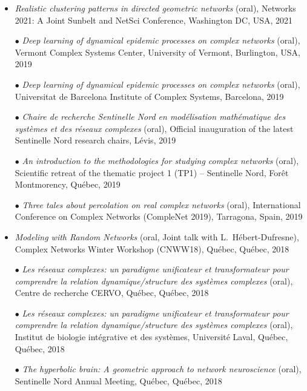 \documentclass[11pt]{article}
\newcommand{\SousTitreA}[2]{{\normalsize\textbf{#1} #2 \vspace{-0.5\baselineskip}}}
\newcommand{\SousTitreB}[2]{{\vspace{0.4\baselineskip}\SousTitreA{#1}{#2}}}
\begin{document}
%
%
%
\SousTitreB{Selected presentations\footnotemark}{}
%
%
\begin{itemize}
%
  \item \textit{Realistic clustering patterns in directed geometric networks} (oral), Networks 2021: A Joint Sunbelt and NetSci Conference, Washington DC, USA, 2021
%
  \item[$\bullet$] \textit{Deep learning of dynamical epidemic processes on complex networks} (oral), Vermont Complex Systems Center, University of Vermont, Burlington, USA, 2019
%
  \item[$\bullet$] \textit{Deep learning of dynamical epidemic processes on complex networks} (oral), Universitat de Barcelona Institute of Complex Systems, Barcelona, 2019
%
  \item[$\bullet$] \textit{Chaire de recherche Sentinelle Nord en modélisation mathématique des systèmes et des réseaux complexes} (oral), Official inauguration of the latest Sentinelle Nord research chairs, L\'evis, 2019
%
  \item[$\bullet$] \textit{An introduction to the methodologies for studying complex networks} (oral), Scientific retreat of the thematic project 1 (TP1) – Sentinelle Nord, For\^et Montmorency, Qu\'ebec, 2019
%
  \item[$\bullet$] \textit{Three tales about percolation on real complex networks} (oral), International Conference on Complex Networks (CompleNet 2019), Tarragona, Spain, 2019
%
  \item \textit{Modeling with Random Networks} (oral, Joint talk with L.~H\'ebert-Dufresne), Complex Networks Winter Workshop (CNWW18), Qu\'ebec, Qu\'ebec, 2018
%
  \item[$\bullet$] \textit{Les réseaux complexes: un paradigme unificateur et transformateur pour comprendre la relation dynamique/structure des systèmes complexes} (oral), Centre de recherche CERVO, Qu\'ebec, Qu\'ebec, 2018
%
  \item[$\bullet$] \textit{Les réseaux complexes: un paradigme unificateur et transformateur pour comprendre la relation dynamique/structure des systèmes complexes} (oral), Institut de biologie intégrative et des systèmes, Université Laval, Qu\'ebec, Qu\'ebec, 2018
%
  \item[$\bullet$] \textit{The hyperbolic brain: A geometric approach to network neuroscience} (oral), Sentinelle Nord Annual Meeting, Qu\'ebec, Qu\'ebec, 2018

\end{itemize}
\end{document}
